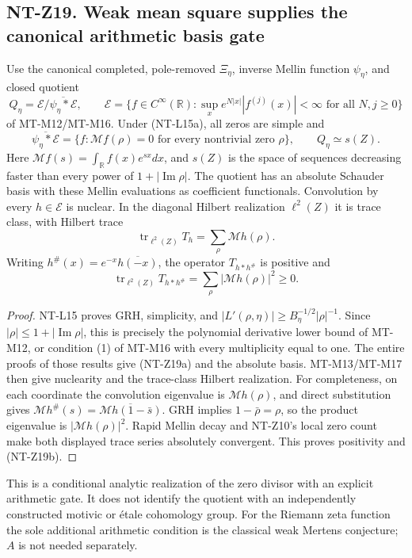 \subsection*{NT-Z19. Weak mean square supplies the canonical arithmetic basis gate}
Use the canonical completed, pole-removed $\Xi_\eta$, inverse Mellin
function $\psi_\eta$, and closed quotient
\[
 Q_\eta=\mathcal E/\overline{\psi_\eta*\mathcal E},\qquad
 \mathcal E=\{f\in C^\infty(\mathbb R):
      \sup_x e^{N|x|}|f^{(j)}(x)|<\infty\text{ for all }N,j\ge0\}
\]
of MT-M12/MT-M16. Under (NT-L15a), all zeros are simple and
\[
 \overline{\psi_\eta*\mathcal E}
   =\{f:\mathcal Mf(\rho)=0\text{ for every nontrivial zero }\rho\},
 \qquad Q_\eta\simeq s(Z).
                                                        \tag{NT-Z19a}
\]
Here $\mathcal Mf(s)=\int_\mathbb Rf(x)e^{sx}dx$,
and $s(Z)$ is the space of sequences decreasing faster than every
power of $1+|\operatorname{Im}\rho|$. The quotient has an absolute
Schauder basis with these Mellin evaluations as coefficient functionals.
Convolution by every $h\in\mathcal E$ is nuclear. In the diagonal
Hilbert realization $\ell^2(Z)$ it is trace class, with Hilbert trace
\[
 \operatorname{tr}_{\ell^2(Z)}T_h=\sum_\rho\mathcal Mh(\rho).
\]
Writing $h^\#(x)=e^{-x}\overline{h(-x)}$, the operator
$T_{h*h^\#}$ is positive and
\[
 \operatorname{tr}_{\ell^2(Z)}T_{h*h^\#}
                     =\sum_\rho|\mathcal Mh(\rho)|^2\ge0.
                                                        \tag{NT-Z19b}
\]
\begin{proof}
NT-L15 proves GRH, simplicity, and
$|L'(\rho,\eta)|\ge B_\eta^{-1/2}|\rho|^{-1}$.
Since $|\rho|\le1+|\operatorname{Im}\rho|$, this is precisely the
polynomial derivative lower bound of MT-M12, or condition (1) of
MT-M16 with every multiplicity equal to one. The entire proofs of
those results give (NT-Z19a) and the absolute basis. MT-M13/MT-M17
then give nuclearity and the trace-class Hilbert realization. For
completeness, on each coordinate the convolution eigenvalue is
$\mathcal Mh(\rho)$, and direct substitution gives
$\mathcal M h^\#(s)=\overline{\mathcal Mh(1-\bar s)}$.
GRH implies $1-\bar\rho=\rho$, so the product eigenvalue is
$|\mathcal Mh(\rho)|^2$. Rapid Mellin decay and NT-Z10's local zero
count make both displayed trace series absolutely convergent. This
proves positivity and (NT-Z19b).
\end{proof}
This is a conditional analytic realization of the zero divisor with an
explicit arithmetic gate. It does not identify the quotient with an
independently constructed motivic or étale cohomology group.
For the Riemann zeta function the sole additional arithmetic condition
is the classical weak Mertens conjecture; $A$ is not needed separately.
